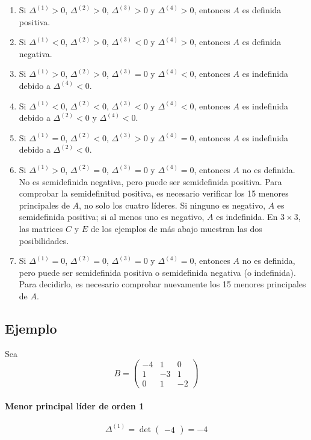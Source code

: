 \documentclass{article}
\begin{document}
\begin{enumerate}
  \item[(a)] Si \(\Delta^{(1)}>0\), \(\Delta^{(2)}>0\), \(\Delta^{(3)}>0\) y \(\Delta^{(4)}>0\), entonces \(A\) es definida positiva.
  \item[(b)] Si \(\Delta^{(1)}<0\), \(\Delta^{(2)}>0\), \(\Delta^{(3)}<0\) y \(\Delta^{(4)}>0\), entonces \(A\) es definida negativa.
  \item[(c)] Si \(\Delta^{(1)}>0\), \(\Delta^{(2)}>0\), \(\Delta^{(3)}=0\) y \(\Delta^{(4)}<0\), entonces \(A\) es indefinida debido a \(\Delta^{(4)}<0\).
  \item[(d)] Si \(\Delta^{(1)}<0\), \(\Delta^{(2)}<0\), \(\Delta^{(3)}<0\) y \(\Delta^{(4)}<0\), entonces \(A\) es indefinida debido a \(\Delta^{(2)}<0\) y \(\Delta^{(4)}<0\).
  \item[(e)] Si \(\Delta^{(1)}=0\), \(\Delta^{(2)}<0\), \(\Delta^{(3)}>0\) y \(\Delta^{(4)}=0\), entonces \(A\) es indefinida debido a \(\Delta^{(2)}<0\).
  \item[(f)] Si \(\Delta^{(1)}>0\), \(\Delta^{(2)}=0\), \(\Delta^{(3)}=0\) y \(\Delta^{(4)}=0\), entonces \(A\) no es definida. No es semidefinida negativa, pero puede ser semidefinida positiva. Para comprobar la semidefinitud positiva, es necesario verificar los 15 menores principales de \(A\), no solo los cuatro líderes. Si ninguno es negativo, \(A\) es semidefinida positiva; si al menos uno es negativo, \(A\) es indefinida. En \(3\times3\), las matrices \(C\) y \(E\) de los ejemplos de más abajo muestran las dos posibilidades.
  \item[(g)] Si \(\Delta^{(1)}=0\), \(\Delta^{(2)}=0\), \(\Delta^{(3)}=0\) y \(\Delta^{(4)}=0\), entonces \(A\) no es definida, pero puede ser semidefinida positiva o semidefinida negativa (o indefinida). Para decidirlo, es necesario comprobar nuevamente los 15 menores principales de \(A\).
\end{enumerate}


\subsection*{Ejemplo}

Sea
\[
B=\begin{pmatrix}
-4&1&0\\
1&-3&1\\
0&1&-2
\end{pmatrix}
\]

\paragraph*{Menor principal líder de orden 1}
\[
\Delta^{(1)}=\det\begin{pmatrix}-4\end{pmatrix}=-4
\]
\end{document}
